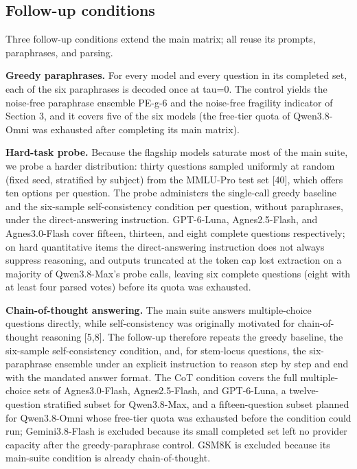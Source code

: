 \documentclass[preprint,12pt]{elsarticle}
\begin{document}
\subsection{Follow-up conditions}

Three follow-up conditions extend the main matrix; all reuse its prompts, paraphrases, and parsing.

\textbf{Greedy paraphrases.} For every model and every question in its completed set, each of the six paraphrases is decoded once at tau=0. The control yields the noise-free paraphrase ensemble PE-g-6 and the noise-free fragility indicator of Section 3, and it covers five of the six models (the free-tier quota of Qwen3.8-Omni was exhausted after completing its main matrix).

\textbf{Hard-task probe.} Because the flagship models saturate most of the main suite, we probe a harder distribution: thirty questions sampled uniformly at random (fixed seed, stratified by subject) from the MMLU-Pro test set [40], which offers ten options per question. The probe administers the single-call greedy baseline and the six-sample self-consistency condition per question, without paraphrases, under the direct-answering instruction. GPT-6-Luna, Agnes2.5-Flash, and Agnes3.0-Flash cover fifteen, thirteen, and eight complete questions respectively; on hard quantitative items the direct-answering instruction does not always suppress reasoning, and outputs truncated at the token cap lost extraction on a majority of Qwen3.8-Max's probe calls, leaving six complete questions (eight with at least four parsed votes) before its quota was exhausted.

\textbf{Chain-of-thought answering.} The main suite answers multiple-choice questions directly, while self-consistency was originally motivated for chain-of-thought reasoning [5,8]. The follow-up therefore repeats the greedy baseline, the six-sample self-consistency condition, and, for stem-locus questions, the six-paraphrase ensemble under an explicit instruction to reason step by step and end with the mandated answer format. The CoT condition covers the full multiple-choice sets of Agnes3.0-Flash, Agnes2.5-Flash, and GPT-6-Luna, a twelve-question stratified subset for Qwen3.8-Max, and a fifteen-question subset planned for Qwen3.8-Omni whose free-tier quota was exhausted before the condition could run; Gemini3.8-Flash is excluded because its small completed set left no provider capacity after the greedy-paraphrase control. GSM8K is excluded because its main-suite condition is already chain-of-thought.
\end{document}
